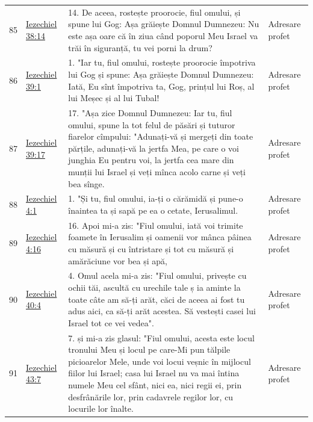 \documentclass[12pt,a4paper,twoside,openany]{book}
\begin{document}
\begin{longtable}{L{0.8cm}L{1.2cm}L{11.9cm}L{0.8cm}}
85 & \href{https://bibliaortodoxa.ro/carte.php?id=33\&cap=38\#14}{Iezechiel 38:14} & 14. De aceea, rostește proorocie, fiul omului, și spune lui Gog: Așa grăiește Domnul Dumnezeu: Nu este așa oare că în ziua când poporul Meu Israel va trăi în siguranță, tu vei porni la drum? & Adresare profet \\
86 & \href{https://bibliaortodoxa.ro/carte.php?id=33\&cap=39\#1}{Iezechiel 39:1} & 1. "Iar tu, fiul omului, rostește proorocie împotriva lui Gog și spune: Așa grăiește Domnul Dumnezeu: Iată, Eu sînt împotriva ta, Gog, prințul lui Roș, al lui Meșec și al lui Tubal! & Adresare profet \\
87 & \href{https://bibliaortodoxa.ro/carte.php?id=33\&cap=39\#17}{Iezechiel 39:17} & 17. "Așa zice Domnul Dumnezeu: Iar tu, fiul omului, spune la tot felul de păsări și tuturor fiarelor cîmpului: "Adunați-vă și mergeți din toate părțile, adunați-vă la jertfa Mea, pe care o voi junghia Eu pentru voi, la jertfa cea mare din munții lui Israel și veți mînca acolo carne și veți bea sînge. & Adresare profet \\
88 & \href{https://bibliaortodoxa.ro/carte.php?id=33\&cap=4\#1}{Iezechiel 4:1} & 1. "Și tu, fiul omului, ia-ți o cărămidă și pune-o înaintea ta și sapă pe ea o cetate, Ierusalimul. & Adresare profet \\
89 & \href{https://bibliaortodoxa.ro/carte.php?id=33\&cap=4\#16}{Iezechiel 4:16} & 16. Apoi mi-a zis: "Fiul omului, iată voi trimite foamete în Ierusalim și oamenii vor mânca pâinea cu măsură și cu întristare și tot cu măsură și amărăciune vor bea și apă, & Adresare profet \\
90 & \href{https://bibliaortodoxa.ro/carte.php?id=33\&cap=40\#4}{Iezechiel 40:4} & 4. Omul acela mi-a zis: "Fiul omului, privește cu ochii tăi, ascultă cu urechile tale ș ia aminte la toate câte am să-ți arăt, căci de aceea ai fost tu adus aici, ca să-ți arăt acestea. Să vestești casei lui Israel tot ce vei vedea". & Adresare profet \\
91 & \href{https://bibliaortodoxa.ro/carte.php?id=33\&cap=43\#7}{Iezechiel 43:7} & 7. și mi-a zis glasul: "Fiul omului, acesta este locul tronului Meu și locul pe care-Mi pun tălpile picioarelor Mele, unde voi locui veșnic în mijlocul fiilor lui Israel; casa lui Israel nu va mai întina numele Meu cel sfânt, nici ea, nici regii ei, prin desfrânările lor, prin cadavrele regilor lor, cu locurile lor înalte. & Adresare profet \\

\end{longtable}
\end{document}
